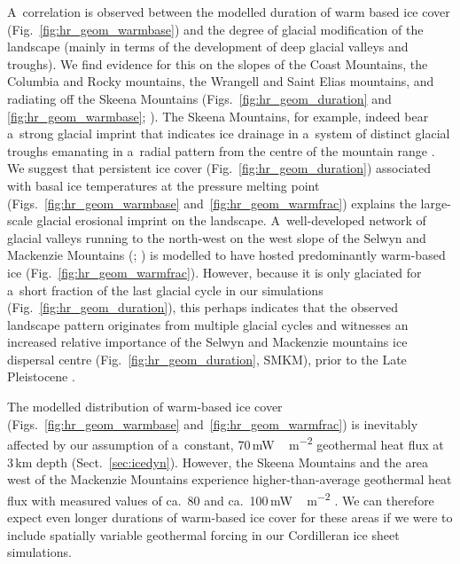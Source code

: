 \documentclass[tc, manuscript]{copernicus}
\begin{document}
      A~correlation is observed between the modelled duration of warm based
      ice cover (Fig.~\ref{fig:hr_geom_warmbase}) and the degree of glacial
      modification of the landscape (mainly in terms of the development of
      deep glacial valleys and troughs). We find evidence for this on the
      slopes of the Coast Mountains, the Columbia and Rocky mountains, the
      Wrangell and Saint Elias mountains, and radiating off the Skeena
      Mountains (Figs.~\ref{fig:hr_geom_duration} and
      \ref{fig:hr_geom_warmbase}; \citealp[Fig.~2]{Kleman.etal.2010}). The
      Skeena Mountains, for example, indeed bear a~strong glacial imprint
      that indicates ice drainage in a~system of distinct glacial troughs
      emanating in a~radial pattern from the centre of the mountain range
      \citep[Fig.~2]{Kleman.etal.2010}. We suggest that persistent ice cover
      (Fig.~\ref{fig:hr_geom_duration}) associated with basal ice
      temperatures at the pressure melting point
      (Figs.~\ref{fig:hr_geom_warmbase} and~\ref{fig:hr_geom_warmfrac})
      explains the large-scale glacial erosional imprint on the landscape.
      A~well-developed network of glacial valleys running to the north-west on
      the west slope of the Selwyn and Mackenzie Mountains
      (\citealp[Fig.~2]{Kleman.etal.2010}; \citealp[Fig.~8]
      {Stroeven.etal.2010}) is modelled to have hosted predominantly
      warm-based ice (Fig.~\ref{fig:hr_geom_warmfrac}). However, because it
      is only glaciated for a~short fraction of the last glacial cycle in
      our simulations (Fig.~\ref{fig:hr_geom_duration}), this perhaps
      indicates that the observed landscape pattern originates from multiple
      glacial cycles and witnesses an increased relative importance of the
      Selwyn and Mackenzie mountains ice dispersal centre
      (Fig.~\ref{fig:hr_geom_duration}, SMKM), prior to the Late Pleistocene
      \citep[cf.][]{Ward.etal.2008, Demuro.etal.2012}.

      The modelled distribution of warm-based ice cover
      (Figs.~\ref{fig:hr_geom_warmbase} and~\ref{fig:hr_geom_warmfrac}) is
      inevitably affected by our assumption of a~constant,
      70\,\unit{mW\,m^{-2}} geothermal heat flux at 3\,\unit{km} depth
      (Sect.~\ref{sec:icedyn}). However, the Skeena Mountains and the area
      west of the Mackenzie Mountains experience higher-than-average
      geothermal heat flux with measured values of ca.~80 and
      ca.~100\,\unit{mW\,m^{-2}} \citep{Blackwell.Richards.2004}. We can
      therefore expect even longer durations of warm-based ice cover for
      these areas if we were to include spatially variable geothermal
      forcing in our Cordilleran ice sheet simulations.
\end{document}
